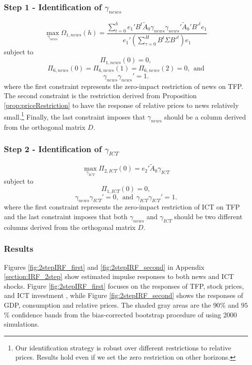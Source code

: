 \documentclass[12pt]{article}
\begin{document}
\subsubsection*{Step 1 - Identification of $\gamma_{news}$}
$$
\max_{\gamma_{news}} \Omega_{1,news}(h) = \frac{ \sum_{t=0}^h e_1' B^t \tilde{A}_0 \gamma_{news} \gamma_{news}' \tilde{A}_0' B'^t e_1 } {e_1' ( \sum_{\tau = 0}^H B^t \Sigma B'^t )e_1}
$$
subject to
$$
\Pi_{1,news}(0) = 0,
$$
$$
\Pi_{6,news}(0) = \Pi_{6,news}(1) = \Pi_{6,news}(2) = 0, \ \ \text{and}
$$
$$
\gamma_{news} \gamma_{news}' = 1.
$$
where the first constraint represents the zero-impact restriction of news on TFP. The second constraint is the restriction derived from Proposition \ref{prop:priceRestriction} to have the response of relative prices to news relatively small.\footnote{Our identification strategy is robust over different restrictions to relative prices. Results hold even if we set the zero restriction on other horizons.} Finally, the last constraint imposes that $\gamma_{news}$ should be a column derived from the orthogonal matrix $D$. 


\subsubsection*{Step 2 - Identification of $\gamma_{ICT}$}
$$
\max_{\gamma_{ICT}} \Pi_{2,ICT}(0) =  e_2' \tilde{A}_0 \gamma_{ICT} 
$$
subject to
$$
\Pi_{1,ICT}(0) = 0,
$$
$$
\gamma_{news} \gamma_{ICT}' = 0, \ \ \text{and} \ \ \gamma_{ICT} \gamma_{ICT}' = 1.
$$
where the first constraint represents the zero-impact restriction of ICT on TFP and the last constraint imposes that both $\gamma_{news}$ and $\gamma_{ICT}$ should be two different columns derived from the orthogonal matrix $D$.

\subsubsection*{Results}

Figures \ref{fig:2stepIRF_first} and \ref{fig:2stepIRF_second} in Appendix \ref{section:IRF_2step} show estimated impulse responses to both news and ICT shocks. Figure \ref{fig:2stepIRF_first} focuses on the responses of TFP, stock prices, and ICT investment , while Figure \ref{fig:2stepIRF_second} shows the responses of GDP, consumption and relative prices. The shaded gray areas are the $90$\% and $95$\% confidence bands from the bias-corrected bootstrap procedure of \cite{kilian1998small} using 2000 simulations. 
\end{document}
